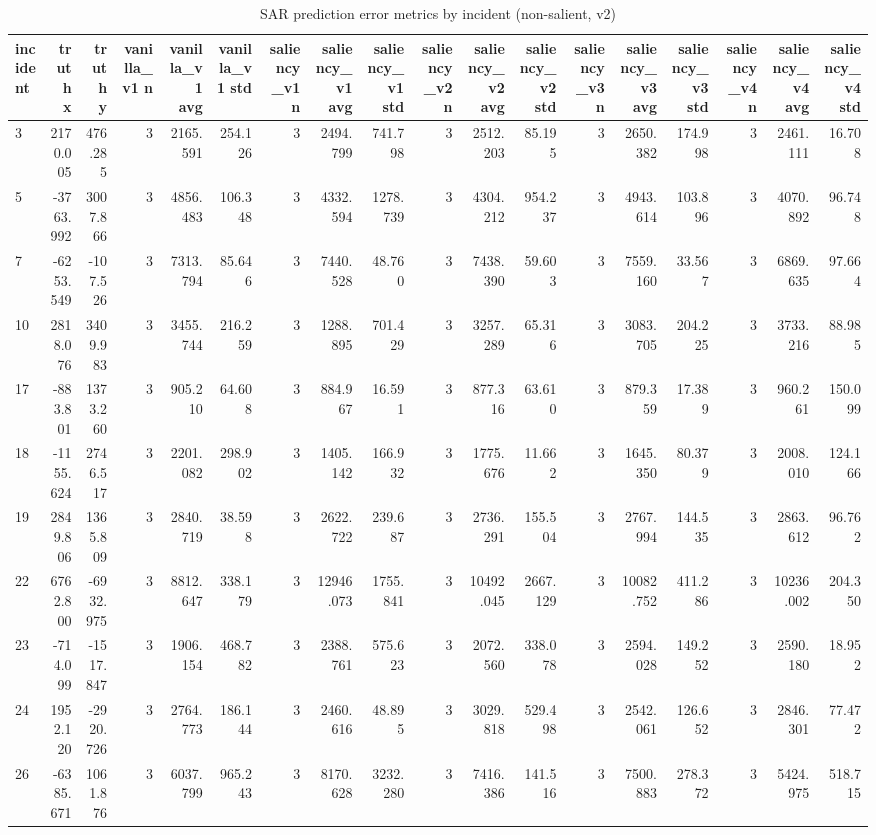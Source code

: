 \begin{table}[ht]
\centering
\caption{SAR prediction error metrics by incident (non-salient, v2)}
\label{tab:sar-incident-errors-non-salient,-v2}
\begin{tabular}{lrrrrrrrrrrrrrrrrr}
\hline
incident & truth x & truth y & vanilla\_v1 n & vanilla\_v1 avg & vanilla\_v1 std & saliency\_v1 n & saliency\_v1 avg & saliency\_v1 std & saliency\_v2 n & saliency\_v2 avg & saliency\_v2 std & saliency\_v3 n & saliency\_v3 avg & saliency\_v3 std & saliency\_v4 n & saliency\_v4 avg & saliency\_v4 std \\
\hline
3 & 2170.005 & 476.285 & 3 & 2165.591 & 254.126 & 3 & 2494.799 & 741.798 & 3 & 2512.203 & 85.195 & 3 & 2650.382 & 174.998 & 3 & 2461.111 & 16.708 \\
5 & -3763.992 & 3007.866 & 3 & 4856.483 & 106.348 & 3 & 4332.594 & 1278.739 & 3 & 4304.212 & 954.237 & 3 & 4943.614 & 103.896 & 3 & 4070.892 & 96.748 \\
7 & -6253.549 & -107.526 & 3 & 7313.794 & 85.646 & 3 & 7440.528 & 48.760 & 3 & 7438.390 & 59.603 & 3 & 7559.160 & 33.567 & 3 & 6869.635 & 97.664 \\
10 & 2818.076 & 3409.983 & 3 & 3455.744 & 216.259 & 3 & 1288.895 & 701.429 & 3 & 3257.289 & 65.316 & 3 & 3083.705 & 204.225 & 3 & 3733.216 & 88.985 \\
17 & -883.801 & 1373.260 & 3 & 905.210 & 64.608 & 3 & 884.967 & 16.591 & 3 & 877.316 & 63.610 & 3 & 879.359 & 17.389 & 3 & 960.261 & 150.099 \\
18 & -1155.624 & 2746.517 & 3 & 2201.082 & 298.902 & 3 & 1405.142 & 166.932 & 3 & 1775.676 & 11.662 & 3 & 1645.350 & 80.379 & 3 & 2008.010 & 124.166 \\
19 & 2849.806 & 1365.809 & 3 & 2840.719 & 38.598 & 3 & 2622.722 & 239.687 & 3 & 2736.291 & 155.504 & 3 & 2767.994 & 144.535 & 3 & 2863.612 & 96.762 \\
22 & 6762.800 & -6932.975 & 3 & 8812.647 & 338.179 & 3 & 12946.073 & 1755.841 & 3 & 10492.045 & 2667.129 & 3 & 10082.752 & 411.286 & 3 & 10236.002 & 204.350 \\
23 & -714.099 & -1517.847 & 3 & 1906.154 & 468.782 & 3 & 2388.761 & 575.623 & 3 & 2072.560 & 338.078 & 3 & 2594.028 & 149.252 & 3 & 2590.180 & 18.952 \\
24 & 1952.120 & -2920.726 & 3 & 2764.773 & 186.144 & 3 & 2460.616 & 48.895 & 3 & 3029.818 & 529.498 & 3 & 2542.061 & 126.652 & 3 & 2846.301 & 77.472 \\
26 & -6385.671 & 1061.876 & 3 & 6037.799 & 965.243 & 3 & 8170.628 & 3232.280 & 3 & 7416.386 & 141.516 & 3 & 7500.883 & 278.372 & 3 & 5424.975 & 518.715 \\

\end{tabular}
\end{table}
